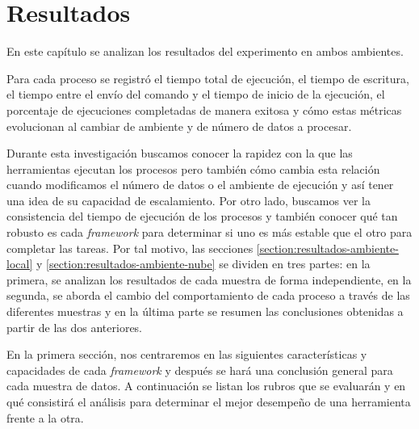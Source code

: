 \chapter{Resultados}
\label{chapter:resultados}

\noindent En este capítulo se analizan los resultados del experimento en ambos ambientes. 

Para cada proceso se registró el tiempo total de ejecución, el tiempo de escritura, el tiempo entre el envío del comando y el tiempo de inicio de la ejecución, el porcentaje de ejecuciones completadas de manera exitosa y cómo estas métricas evolucionan al cambiar de ambiente y de número de datos a procesar.

Durante esta investigación buscamos conocer la rapidez con la que las herramientas ejecutan los procesos pero también cómo cambia esta relación cuando modificamos el número de datos o el ambiente de ejecución y así tener una idea de su capacidad de escalamiento. Por otro lado, buscamos ver la consistencia del tiempo de ejecución de los procesos y también conocer qué tan robusto es cada \textit{framework} para determinar si uno es más estable que el otro para completar las tareas. Por tal motivo, las secciones \ref{section:resultados-ambiente-local} y \ref{section:resultados-ambiente-nube} se dividen en tres partes: en la primera, se analizan los resultados de cada muestra de forma independiente, en la segunda, se aborda el cambio del comportamiento de cada proceso a través de las diferentes muestras y en la última parte se resumen las conclusiones obtenidas a partir de las dos anteriores.

En la primera sección, nos centraremos en las siguientes características y capacidades de cada \textit{framework} y después se hará una conclusión general para cada muestra de datos. A continuación se listan los rubros que se evaluarán y en qué consistirá el análisis para determinar el mejor desempeño de una herramienta frente a la otra.

